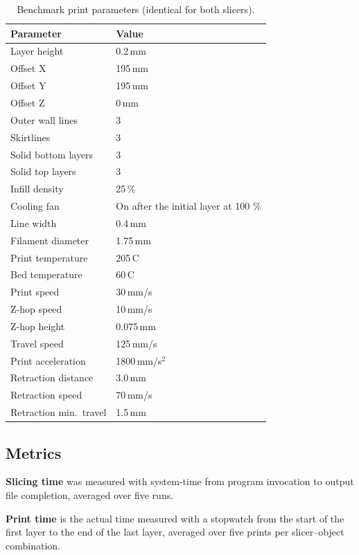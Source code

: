 \documentclass[10pt,twocolumn,a4paper]{article}
\begin{document}
\begin{table}[H]
\centering
\caption{Benchmark print parameters (identical for both slicers).}
\label{tab:params}
\small
\begin{tabular}{@{}ll@{}}
\toprule
\textbf{Parameter} & \textbf{Value} \\
\midrule
Layer height & 0.2\,mm \\
Offset X & 195\,mm \\
Offset Y & 195\,mm \\
Offset Z & 0\,mm \\
Outer wall lines & 3 \\
Skirtlines & 3 \\
Solid bottom layers & 3 \\
Solid top layers & 3 \\
Infill density & 25\,\% \\
Cooling fan & On after the initial layer at 100 \% \\
Line width & 0.4\,mm \\
Filament diameter & 1.75\,mm \\
Print temperature & 205\,\textdegree{}C \\
Bed temperature & 60\,\textdegree{}C \\
Print speed & 30\,mm/s \\
Z-hop speed & 10\,mm/s \\
Z-hop height & 0.075\,mm \\
Travel speed & 125\,mm/s \\
Print acceleration & 1800\,mm/s$^2$ \\
Retraction distance & 3.0\,mm \\
Retraction speed & 70\,mm/s \\
Retraction min.\ travel & 1.5\,mm \\
\bottomrule
\end{tabular}
\end{table}

\subsection{Metrics}

\textbf{Slicing time} was measured with system-time from
program invocation to output file completion, averaged over five
runs.

\textbf{Print time} is the actual time measured with a stopwatch
from the start of the first layer to the end of the last layer,
averaged over five prints per slicer–object combination.
\end{document}
